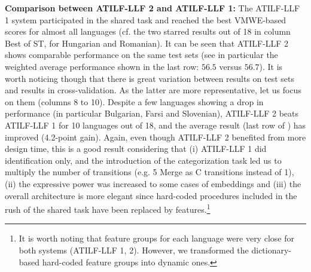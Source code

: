 \documentclass[output=paper,modfonts]{langscibook}
\begin{document}
\textbf{Comparison between ATILF-LLF 2 and ATILF-LLF 1:}
The ATILF-LLF 1 system participated in the shared task and reached the best VMWE-based scores for almost all languages (cf. the two starred results out of 18 in column Best of ST, for Hungarian and Romanian). It can be seen that ATILF-LLF 2 shows comparable performance on the same test sets (see in particular the weighted average performance shown in the last row: $56.5$ versus $56.7$). It is worth noticing though that there is great variation between results on test sets and results in cross-validation. As the latter are more representative, let us focus on them (columns 8 to 10). Despite a few languages showing a drop in performance (in particular Bulgarian, Farsi and Slovenian), ATILF-LLF 2 beats ATILF-LLF 1  for 10 languages out of 18, and the average result (last row of ) has improved (4.2-point gain). Again, even though ATILF-LLF 2 benefited from more design time, this is a good result considering that (i) ATILF-LLF 1 did identification only, and the introduction of the categorization task led us to multiply the number of transitions (e.g. 5 Merge as C transitions instead of 1), (ii) the expressive power was increased to some cases of embeddings and (iii) the overall architecture is more elegant since hard-coded procedures included in the rush of the shared task have been replaced by features.\footnote{It is worth noting that feature groups for each language were very close for both systems (ATILF-LLF 1, 2). However, we transformed the dictionary-based hard-coded feature groups into dynamic ones.}
\end{document}
